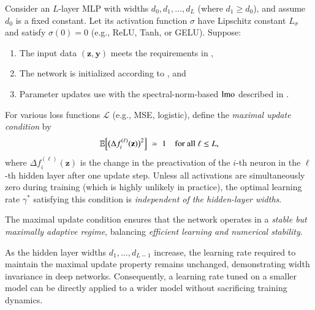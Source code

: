 \begin{toappendix}

\begin{lemma}
\label{lemma:mu_transfer}
Consider an $L$-layer MLP with widths $d_0, d_1, \dots, d_L$ (where $d_1 \ge d_0$), and assume $d_0$ is a fixed constant. 
Let its activation function $\sigma$ have Lipschitz constant $L_\sigma$ and satisfy $\sigma(0) = 0$ 
(e.g., ReLU, Tanh, or GELU). Suppose:
\begin{enumerate}[label=(\roman*)]
    \item The input data $(\mathbf{z}, \mathbf{y})$ meets the requirements in 
    ,
    \item The network is initialized according to , and
    \item Parameter updates use  with the spectral-norm-based $\operatorname{lmo}$ described in .
\end{enumerate}

For various loss functions $\mathcal{L}$ (e.g., MSE, logistic), define the \emph{maximal update 
condition} by
\[
  \mathbb{E}\Bigl[\bigl(\Delta f^{(\ell)}_i(\mathbf{z})\bigr)^2\Bigr] \;\simeq\; 1 
  \quad \text{for all } \ell \le L,
\]
where $\Delta f^{(\ell)}_i(\mathbf{z})$ is the change in the preactivation of the $i$-th neuron 
in the $\ell$-th hidden layer after one update step. 
Unless all activations are simultaneously zero during training (which is highly unlikely in 
practice), the optimal learning rate $\gamma^*$ satisfying this condition is 
\emph{independent of the hidden-layer widths}.

\end{lemma}
\end{toappendix}
\begin{toappendix}

\begin{remark}
The maximal update condition ensures that the network operates in a \emph{stable but maximally adaptive regime}, balancing \emph{efficient learning and numerical stability}.
\end{remark}
\begin{remark}
As the hidden layer widths $d_1, \dots, d_{L-1}$ increase, the learning rate required to maintain the maximal update property remains unchanged, demonstrating width invariance in deep networks. Consequently, a learning rate tuned on a smaller model can be directly applied to a wider model without sacrificing training dynamics.
\end{remark}
\end{toappendix}

